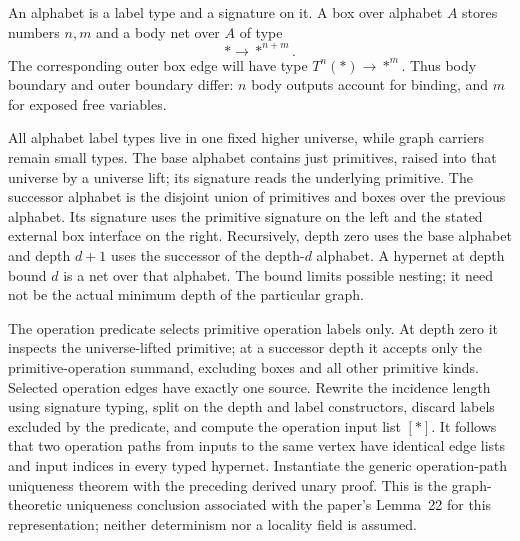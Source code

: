 \begin{definition}\label{term:box}
An alphabet is a label type and a signature on it. A box over alphabet $A$ stores
numbers $n,m$ and a body net over $A$ of type
\[
 *\longrightarrow *^{n+m}.
\]
The corresponding outer box edge will have type
$T^n(*)\longrightarrow *^m$. Thus body boundary and outer boundary differ:
$n$ body outputs account for binding, and $m$ for exposed free variables.
\end{definition}
All alphabet label types live in one fixed higher universe, while graph carriers
remain small types. The base alphabet contains just primitives, raised into that
universe by a universe lift; its signature reads the underlying primitive. The
successor alphabet is the disjoint union of primitives and boxes over the previous
alphabet. Its signature uses the primitive signature on the left and the stated
external box interface on the right.
Recursively, depth zero uses the base alphabet and depth $d+1$ uses the successor
of the depth-$d$ alphabet. A hypernet at depth bound $d$ is a net over that
alphabet. The bound limits possible nesting; it need not be the actual minimum
depth of the particular graph.

The operation predicate selects primitive operation labels only. At depth zero
it inspects the universe-lifted primitive; at a successor depth it accepts only
the primitive-operation summand, excluding boxes and all other primitive kinds.
Selected operation edges have exactly one source. Rewrite the incidence length
using signature typing, split on the depth and label constructors, discard labels
excluded by the predicate, and compute the operation input list $[*]$.
It follows that two operation paths from inputs to the same vertex have identical
edge lists and input indices in every typed hypernet. Instantiate the generic
operation-path uniqueness theorem with the preceding derived unary proof. This
is the graph-theoretic uniqueness conclusion associated with the paper's Lemma~22
for this representation; neither determinism nor a locality field is assumed.

